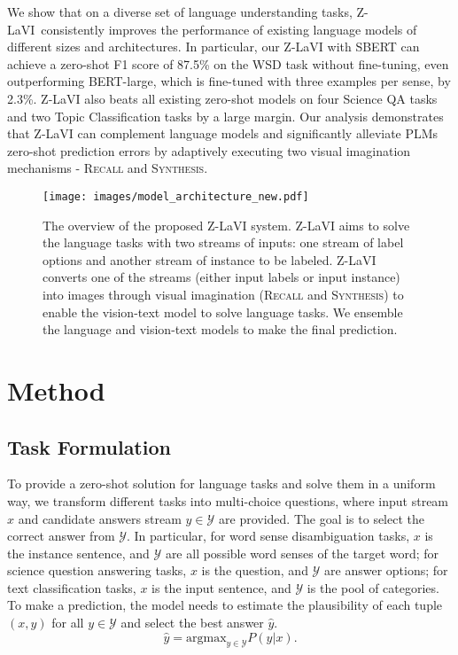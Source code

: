 \documentclass[11pt]{article}
\newcommand{\model}{Z-LaVI}
\begin{document}
We show that on a diverse set of language understanding tasks, \model~consistently improves the performance of existing language models of different sizes and architectures. In particular, our Z-LaVI with SBERT can achieve a zero-shot F1 score of 87.5\% on the WSD task without fine-tuning, even outperforming BERT-large, which is fine-tuned with three examples per sense, by 2.3\%. Z-LaVI also beats all existing zero-shot models on four Science QA tasks and two Topic Classification tasks by a large margin.
Our analysis demonstrates that Z-LaVI can complement language models and significantly alleviate PLMs zero-shot prediction errors by adaptively executing two visual imagination mechanisms - \textsc{Recall} and \textsc{Synthesis}.




\begin{figure}[!t]
\centering
    \texttt{[image: images/model\_architecture\_new.pdf]}
    \caption{The overview of the proposed Z-LaVI system. Z-LaVI aims to solve the language tasks with two streams of inputs: one stream of label options and another stream of instance to be labeled. Z-LaVI converts one of the streams (either input labels or input instance) into images through visual imagination (\textsc{Recall} and \textsc{Synthesis}) to enable the vision-text model to solve language tasks. We ensemble the language and vision-text models to make the final prediction.}
    \label{fig:model}
\end{figure}

\section{Method}
\subsection{Task Formulation}
To provide a zero-shot solution for language tasks and solve them in a uniform way, we transform different tasks into multi-choice questions, where input stream $x$ and candidate answers stream $y \in \mathcal{Y}$ are provided. The goal is to select the correct answer from $\mathcal{Y}$.
In particular, for word sense disambiguation tasks, $x$ is the instance sentence, and $\mathcal{Y}$ are all possible word senses of the target word; for science question answering tasks, $x$ is the question, and $\mathcal{Y}$ are answer options; for text classification tasks, $x$ is the input sentence, and $\mathcal{Y}$ is the pool of categories.
To make a prediction, the model needs to estimate the plausibility of each tuple $(x, y)$ for all $y \in \mathcal{Y}$ and select the best answer $\hat{y}$.
\begin{equation}
    \hat{y} = \text{argmax}_{y \in \mathcal{Y}} P(y | x).
\end{equation}
\end{document}
